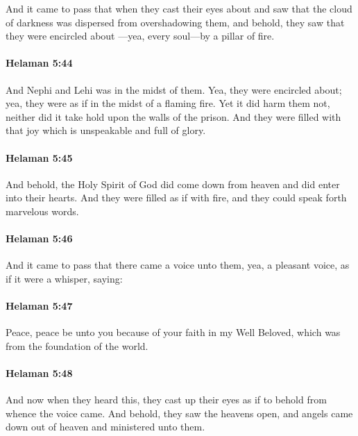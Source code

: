 			And it came to pass that when they cast their eyes about
			and saw that the cloud of darkness was dispersed from overshadowing them,
			and behold, they saw that they were encircled about
			---yea, every soul---by a pillar of fire.

		\paragraph{Helaman 5:44} %
			\label{HELAMAN-5-44}

			And Nephi and Lehi was in the midst of them.
			Yea, they were encircled about;
			yea, they were as if in the midst of a flaming fire.
			Yet it did harm them not,
			neither did it take hold upon the walls of the prison.
			And they were filled with that joy which is unspeakable and full of glory.

		\paragraph{Helaman 5:45} %
			\label{HELAMAN-5-45}

			And behold, the Holy Spirit of God did come down from heaven
			and did enter into their hearts.
			And they were filled as if with fire,
			and they could speak forth marvelous words.

		\paragraph{Helaman 5:46} %
			\label{HELAMAN-5-46}

			And it came to pass that there came a voice unto them,
			yea, a pleasant voice, as if it were a whisper, saying:

		\paragraph{Helaman 5:47} %
			\label{HELAMAN-5-47}

			Peace, peace be unto you
			because of your faith in my Well Beloved,
			which was from the foundation of the world.

		\paragraph{Helaman 5:48} %
			\label{HELAMAN-5-48}

			And now when they heard this,
			they cast up their eyes as if to behold from whence the voice came.
			And behold, they saw the heavens open,
			and angels came down out of heaven and ministered unto them.

